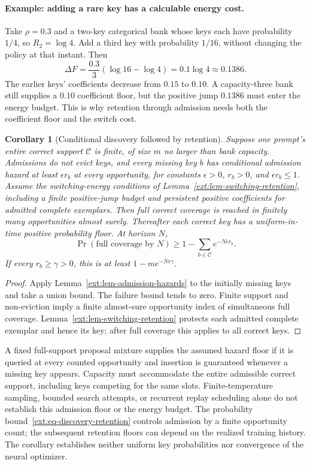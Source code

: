 \documentclass{article}
\newcommand{\1}{\mathbf 1}
\newtheorem{corollary}[lemma]{Corollary}
\theoremstyle{remark}
\theoremstyle{definition}
\theoremstyle{plain}
\begin{document}
\paragraph{Example: adding a rare key has a calculable energy cost.}
Take $\rho=0.3$ and a two-key categorical bank whose keys each have
probability $1/4$, so $R_2=\log4$. Add a third key with probability $1/16$,
without changing the policy at that instant. Then
\[
 \Delta F=\frac{0.3}{3}(\log16-\log4)
          =0.1\log4\approx0.1386.
\]
The earlier keys' coefficients decrease from $0.15$ to $0.10$. A
capacity-three bank still supplies a $0.10$ coefficient floor, but the
positive jump $0.1386$ must enter the energy budget. This is why retention
through admission needs both the coefficient floor and the switch cost.

\begin{corollary}[Conditional discovery followed by retention]
\label{ext:cor-discovery-retention}
Suppose one prompt's entire correct support $\mathcal C$ is finite, of size
$m$ no larger than bank capacity. Admissions do not evict keys, and every
missing key $b$ has conditional admission hazard at least $\epsilon r_b$ at
every opportunity, for constants $\epsilon>0$, $r_b>0$, and
$\epsilon r_b\le1$. Assume the switching-energy conditions of
Lemma~\ref{ext:lem-switching-retention}, including a finite positive-jump
budget and persistent positive coefficients for admitted complete exemplars.
Then full correct coverage is reached in finitely many opportunities almost
surely. Thereafter each correct key has a uniform-in-time positive
probability floor. At horizon $N$,
\begin{equation}
 \Pr(\text{full coverage by }N)
 \ge 1-\sum_{b\in\mathcal C}e^{-N\epsilon r_b}.
 \label{ext:eq-discovery-retention}
\end{equation}
If every $r_b\ge\gamma>0$, this is at least $1-me^{-N\epsilon\gamma}$.
\end{corollary}
\begin{proof}
Apply Lemma~\ref{ext:lem-admission-hazards} to the initially missing keys and
take a union bound. The failure bound tends to zero. Finite support and
non-eviction imply a finite almost-sure opportunity index of simultaneous
full coverage. Lemma~\ref{ext:lem-switching-retention} protects each admitted
complete exemplar and hence its key; after full coverage this applies to
all correct keys.
\end{proof}

A fixed full-support proposal mixture supplies the assumed hazard floor if
it is queried at every counted opportunity and insertion is guaranteed
whenever a missing key appears. Capacity must accommodate the entire
admissible correct support, including keys competing for the same slots.
Finite-temperature sampling, bounded search attempts, or recurrent replay
scheduling alone do not establish this admission floor or the energy
budget. The probability bound~\eqref{ext:eq-discovery-retention} controls
admission by a finite opportunity count; the subsequent retention floors
can depend on the realized training history. The corollary establishes
neither uniform key probabilities nor convergence of the neural optimizer.
\end{document}
